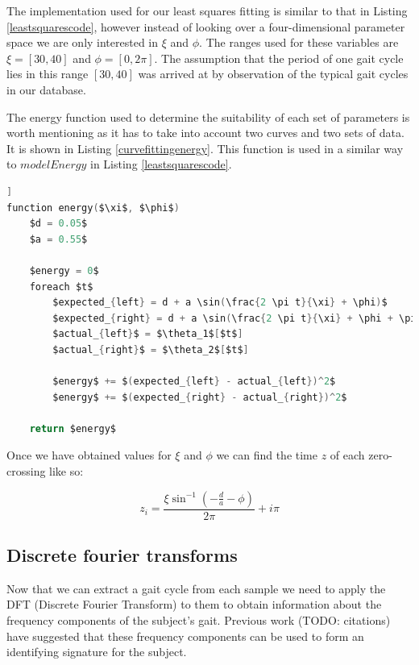 The implementation used for our least squares fitting is similar to that in Listing \ref{leastsquarescode}, however instead of looking over a four-dimensional parameter space we are only interested in $\xi$ and $\phi$.
The ranges used for these variables are $\xi = [30, 40]$ and $\phi = [0, 2\pi]$.
The assumption that the period of one gait cycle lies in this range $[30, 40]$ was arrived at by observation of the typical gait cycles in our database.

The energy function used to determine the suitability of each set of parameters is worth mentioning as it has to take into account two curves and two sets of data.
It is shown in Listing \ref{curvefittingenergy}.
This function is used in a similar way to $modelEnergy$ in Listing \ref{leastsquarescode}.

\begin{lstlisting}[firstnumber=1,language=c,morekeywords={step,function,foreach,in},frame=single,mathescape=true,caption={Energy function pseudo-code},label={curvefittingenergy},float=[tb]]
function energy($\xi$, $\phi$)
	$d = 0.05$
	$a = 0.55$
	
	$energy = 0$
	foreach $t$
		$expected_{left} = d + a \sin(\frac{2 \pi t}{\xi} + \phi)$
		$expected_{right} = d + a \sin(\frac{2 \pi t}{\xi} + \phi + \pi)$
		$actual_{left}$ = $\theta_1$[$t$]
		$actual_{right}$ = $\theta_2$[$t$]
		
		$energy$ += $(expected_{left} - actual_{left})^2$
		$energy$ += $(expected_{right} - actual_{right})^2$
	
	return $energy$
\end{lstlisting}

Once we have obtained values for $\xi$ and $\phi$ we can find the time $z$ of each zero-crossing like so:

\begin{equation}
	z_i = \frac{\xi \sin^{-1}\left(-\frac{d}{a} - \phi\right)}{2\pi} + i\pi
\end{equation}


\subsection{Discrete fourier transforms}

Now that we can extract a gait cycle from each sample we need to apply the DFT (Discrete Fourier Transform) to them to obtain information about the frequency components of the subject's gait.
Previous work (TODO: citations) have suggested that these frequency components can be used to form an identifying signature for the subject.


